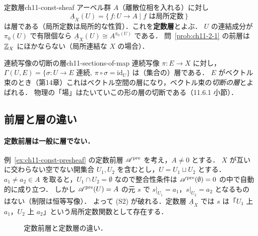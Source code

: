 \begin{myex}{定数層}{ch11-const-sheaf}
アーベル群 $A$（離散位相を入れる）に対し
\[
  \underline{A}_X(U) = \{\, f\colon U\to A \mid f \text{ は局所定数} \,\}
\]
は層である（局所定数は局所的な性質）．これを\textbf{定数層}とよぶ．
$U$ の連結成分が $\pi_0(U)$ で有限個なら $\underline{A}_X(U)\cong A^{\pi_0(U)}$ である．
問~\ref{prob:ch11-2-1} の前層は $\underline{\mathbb{Z}}_X$ にほかならない（局所連結な $X$ の場合）．
\end{myex}

\begin{myex}{連続写像の切断の層}{ch11-sections-of-map}
連続写像 $\pi\colon E\to X$ に対し，$\Gamma(U,E)=\{\sigma\colon U\to E \text{ 連続},\ \pi\circ\sigma=\mathrm{id}_U\}$ は（集合の）層である．
$E$ がベクトル束のとき（第14章）これはベクトル空間の層になり，ベクトル束の\emph{切断の層}とよばれる．
物理の「場」はたいていこの形の層の切断である（11.6.1 小節）．
\end{myex}

\subsection{前層と層の違い}

\paragraph{定数前層は一般に層でない．}
例~\ref{ex:ch11-const-presheaf} の定数前層 $\mathscr{A}^{\mathrm{pre}}$ を考え，$A\neq0$ とする．
$X$ が互いに交わらない空でない開集合 $U_1,U_2$ を含むとし，$U=U_1\sqcup U_2$ とする．
$a_1\neq a_2\in A$ を取ると，$U_1\cap U_2=\emptyset$ なので整合性条件は $\mathscr{A}^{\mathrm{pre}}(\emptyset)=0$ の中で自動的に成り立つ．
しかし $\mathscr{A}^{\mathrm{pre}}(U)=A$ の元 $s$ で $s|_{U_1}=a_1$，$s|_{U_2}=a_2$ となるものはない（制限は恒等写像）．
よって (S2) が破れる．定数層 $\underline{A}_X$ では $s$ は「$U_1$ 上 $a_1$，$U_2$ 上 $a_2$」という局所定数関数として存在する．

\begin{figure}[htbp]
\centering
{}
\caption{定数前層と定数層の違い．}
\label{fig:ch11-constant}
\end{figure}

